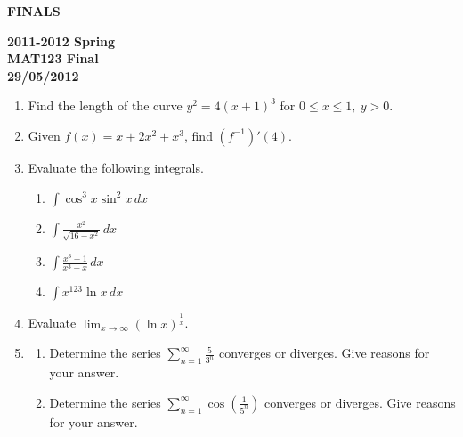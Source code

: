 \documentclass[a4paper, 12pt]{article}
\begin{document}
\newpage
\vspace*{\fill}
\begin{center}
{}
\Huge \textbf{FINALS}
\end{center}
\vspace*{\fill}

\newpage
{}
{}

\begin{center}
\textbf{2011-2012 Spring\\MAT123 Final\\29/05/2012}
\end{center}

\begin{enumerate}[leftmargin=*,label=\textbf{\arabic*.}]
\item Find the length of the curve $y^2=4(x+1)^3$ for $0\leq x\leq1,\: y>0$.

\item Given $f(x)=x+2x^2+x^3$, find $\left(f^{-1}\right)'(4)$.

\item Evaluate the following integrals.
\begin{enumerate}[leftmargin=*,label=\textbf{\alph*.}]
\item $\displaystyle\int\cos^3x\sin^2x\,dx$
\item $\displaystyle\int\frac{x^2}{\sqrt{16-x^2}}\,dx$
\item $\displaystyle\int\frac{x^3-1}{x^3-x}\,dx$
\item $\displaystyle\int x^{123}\ln x\,dx$
\end{enumerate}

\item Evaluate $\displaystyle\lim_{x\to\infty}(\ln x)^{\textstyle\frac1x}$.

\item
\begin{enumerate}[leftmargin=*,label=\textbf{\alph*.}]
\item Determine the series  $\displaystyle\sum_{n=1}^\infty{\frac5{3^n}}$ converges or diverges. Give reasons for your answer.

\item Determine the series $\displaystyle\sum_{n=1}^\infty\cos\left(\frac1{5^n}\right)$ converges or diverges. Give reasons for your answer.


\end{enumerate}
\end{enumerate}
\end{document}
